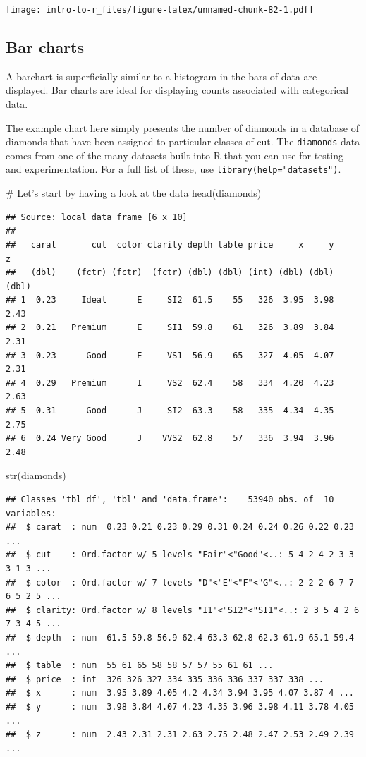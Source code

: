 \documentclass[a4paper]{book}
\newenvironment{Shaded}{}{}
\newcommand{\KeywordTok}[1]{\textcolor[rgb]{0.00,0.00,1.00}{{#1}}}
\newcommand{\CommentTok}[1]{\textcolor[rgb]{0.00,0.50,0.00}{{#1}}}
\newcommand{\NormalTok}[1]{{#1}}
\newlength{\leftbarwidth}
\newlength{\leftbarsep}
\newcommand*{\leftbarcolorcmd}{\color{darkgray}}%
\renewenvironment{leftbar}{%
    \def\FrameCommand{{\leftbarcolorcmd{\vrule width \leftbarwidth\relax\hspace {\leftbarsep}}}}%
    \MakeFramed {\advance \hsize -\width \FrameRestore }%
}{%
    \endMakeFramed
}
\renewenvironment{Shaded}
{\vspace{0em}\begin{leftbar}\begin{snugshade}}
{\end{snugshade}\end{leftbar}\vspace{0pt}}
\begin{document}
\texttt{[image: intro-to-r\_files/figure-latex/unnamed-chunk-82-1.pdf]}

\subsection{Bar charts}\label{bar-charts}

A barchart is superficially similar to a histogram in the bars of data
are displayed. Bar charts are ideal for displaying counts associated
with categorical data.

The example chart here simply presents the number of diamonds in a
database of diamonds that have been assigned to particular classes of
cut. The \texttt{diamonds} data comes from one of the many datasets
built into R that you can use for testing and experimentation. For a
full list of these, use \texttt{library(help="datasets")}.

\begin{Shaded}
\begin{Highlighting}[]
\CommentTok{# Let's start by having a look at the data}
\KeywordTok{head}\NormalTok{(diamonds)}
\end{Highlighting}
\end{Shaded}

\begin{verbatim}
## Source: local data frame [6 x 10]
## 
##   carat       cut  color clarity depth table price     x     y     z
##   (dbl)    (fctr) (fctr)  (fctr) (dbl) (dbl) (int) (dbl) (dbl) (dbl)
## 1  0.23     Ideal      E     SI2  61.5    55   326  3.95  3.98  2.43
## 2  0.21   Premium      E     SI1  59.8    61   326  3.89  3.84  2.31
## 3  0.23      Good      E     VS1  56.9    65   327  4.05  4.07  2.31
## 4  0.29   Premium      I     VS2  62.4    58   334  4.20  4.23  2.63
## 5  0.31      Good      J     SI2  63.3    58   335  4.34  4.35  2.75
## 6  0.24 Very Good      J    VVS2  62.8    57   336  3.94  3.96  2.48
\end{verbatim}

\begin{Shaded}
\begin{Highlighting}[]
\KeywordTok{str}\NormalTok{(diamonds)}
\end{Highlighting}
\end{Shaded}

\begin{verbatim}
## Classes 'tbl_df', 'tbl' and 'data.frame':    53940 obs. of  10 variables:
##  $ carat  : num  0.23 0.21 0.23 0.29 0.31 0.24 0.24 0.26 0.22 0.23 ...
##  $ cut    : Ord.factor w/ 5 levels "Fair"<"Good"<..: 5 4 2 4 2 3 3 3 1 3 ...
##  $ color  : Ord.factor w/ 7 levels "D"<"E"<"F"<"G"<..: 2 2 2 6 7 7 6 5 2 5 ...
##  $ clarity: Ord.factor w/ 8 levels "I1"<"SI2"<"SI1"<..: 2 3 5 4 2 6 7 3 4 5 ...
##  $ depth  : num  61.5 59.8 56.9 62.4 63.3 62.8 62.3 61.9 65.1 59.4 ...
##  $ table  : num  55 61 65 58 58 57 57 55 61 61 ...
##  $ price  : int  326 326 327 334 335 336 336 337 337 338 ...
##  $ x      : num  3.95 3.89 4.05 4.2 4.34 3.94 3.95 4.07 3.87 4 ...
##  $ y      : num  3.98 3.84 4.07 4.23 4.35 3.96 3.98 4.11 3.78 4.05 ...
##  $ z      : num  2.43 2.31 2.31 2.63 2.75 2.48 2.47 2.53 2.49 2.39 ...
\end{verbatim}
\end{document}

